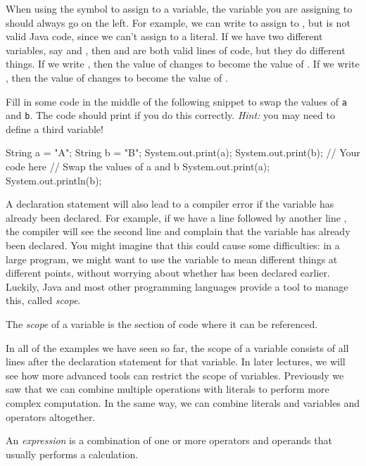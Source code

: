 When using the \ic{=} symbol to assign to a variable, the variable you are assigning to should always go on the left. For example, we can write  to assign  to , but  is not valid Java code, since we can't assign to a literal. If we have two different variables, say  and , then  and  are both valid lines of code, but they do different things. If we write , then the value of  changes to become the value of . If we write , then the value of  changes to become the value of .	
\begin{example}	
  Fill in some code in the middle of the following snippet to swap the values of \texttt{a} and \texttt{b}. The code should print  if you do this correctly. \emph{Hint:} you may need to define a third variable!	
  \begin{code}	
    String a = "A";	
    String b = "B";	
    System.out.print(a);	
    System.out.print(b);	
    // Your code here	
    // Swap the values of a and b	
    System.out.print(a);	
    System.out.println(b);	
  \end{code}	
\end{example}	
A declaration statement will also lead to a compiler error if the variable has already been declared. For example, if we have a line  followed by another line , the compiler will see the second line and complain that the variable  has already been declared. You might imagine that this could cause some difficulties: in a large program, we might want to use the variable  to mean different things at different points, without worrying about whether  has been declared earlier. Luckily, Java and most other programming languages provide a tool to manage this, called \emph{scope}.	
\begin{definition}	
  The \emph{scope} of a variable is the section of code where it can be referenced.	
\end{definition}	
In all of the examples we have seen so far, the scope of a variable consists of all lines after the declaration statement for that variable. In later lectures, we will see how more advanced tools can restrict the scope of variables.	
Previously we saw that we can combine multiple operations with literals to perform more complex computation. In the same way, we can combine literals and variables and operators altogether.	
\begin{definition}	
An \emph{expression} is a combination of one or more operators and operands that usually performs a calculation.	
\end{definition}	
